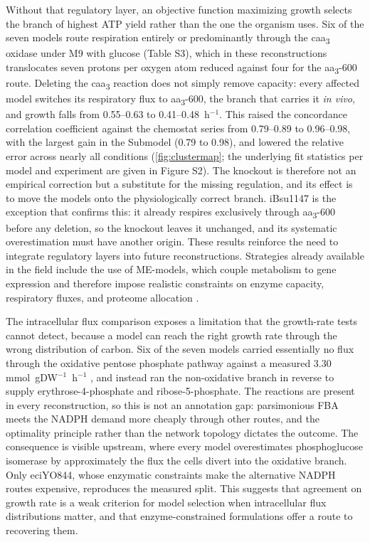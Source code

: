\documentclass[11pt, a4paper]{article}
\begin{document}
Without that regulatory layer, an objective function maximizing growth selects the branch of highest ATP yield rather than the one the organism uses. Six of the seven models route respiration entirely or predominantly through the caa\textsubscript{3} oxidase under M9 with glucose (Table S3), which in these reconstructions translocates seven protons per oxygen atom reduced against four for the aa\textsubscript{3}-600 route. Deleting the caa\textsubscript{3} reaction does not simply remove capacity: every affected model switches its respiratory flux to aa\textsubscript{3}-600, the branch that carries it \textit{in vivo}, and growth falls from 0.55--0.63 to 0.41--0.48~h$^{-1}$. This raised the concordance correlation coefficient against the chemostat series from 0.79--0.89 to 0.96--0.98, with the largest gain in the Submodel (0.79 to 0.98), and lowered the relative error across nearly all conditions (\autoref{fig:clustermap}; the underlying fit statistics per model and experiment are given in Figure S2). The knockout is therefore not an empirical correction but a substitute for the missing regulation, and its effect is to move the models onto the physiologically correct branch. iBsu1147 is the exception that confirms this: it already respires exclusively through aa\textsubscript{3}-600 before any deletion, so the knockout leaves it unchanged, and its systematic overestimation must have another origin. These results reinforce the need to integrate regulatory layers into future reconstructions. Strategies already available in the field include the use of ME-models, which couple metabolism to gene expression and therefore impose realistic constraints on enzyme capacity, respiratory fluxes, and proteome allocation \parencite{lloyd-2018}.

The intracellular flux comparison exposes a limitation that the growth-rate tests cannot detect, because a model can reach the right growth rate through the wrong distribution of carbon. Six of the seven models carried essentially no flux through the oxidative pentose phosphate pathway against a measured 3.30 mmol~gDW$^{-1}$~h$^{-1}$ \parencite{chubukov-2013}, and instead ran the non-oxidative branch in reverse to supply erythrose-4-phosphate and ribose-5-phosphate. The reactions are present in every reconstruction, so this is not an annotation gap: parsimonious FBA meets the NADPH demand more cheaply through other routes, and the optimality principle rather than the network topology dictates the outcome. The consequence is visible upstream, where every model overestimates phosphoglucose isomerase by approximately the flux the cells divert into the oxidative branch. Only eciYO844, whose enzymatic constraints make the alternative NADPH routes expensive, reproduces the measured split. This suggests that agreement on growth rate is a weak criterion for model selection when intracellular flux distributions matter, and that enzyme-constrained formulations offer a route to recovering them.
\end{document}
